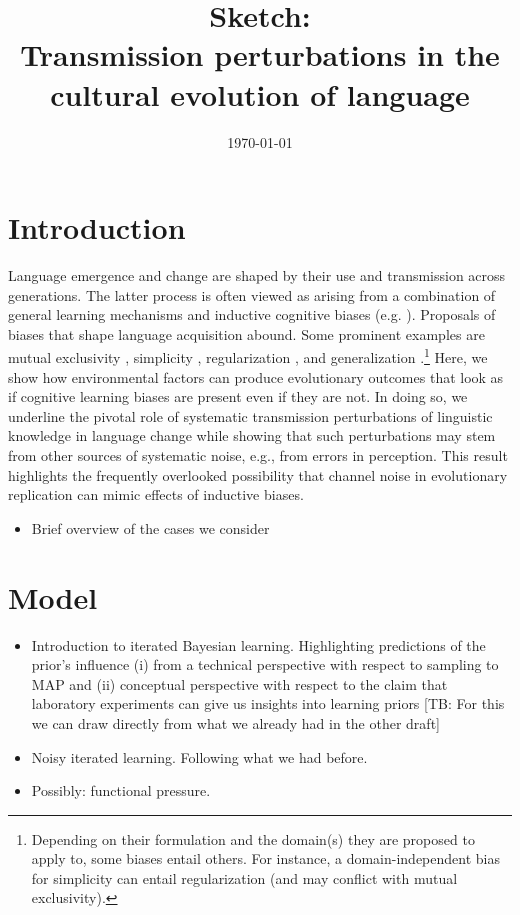 \documentclass[11pt]{article}
\title{Sketch:\\Transmission perturbations in the cultural evolution of language}
\author{%
    \today
}
\date{}
\newcommand{\tb}[1]{\textcolor[rgb]{.8,.33,.0}{[TB: #1]}}%
\begin{document}
\maketitle

\section{Introduction}
Language emergence and change are shaped by their use and transmission across generations. The latter process is often viewed as arising from a combination of general learning mechanisms and inductive cognitive biases (e.g. \citealt{griffiths+kalish:2007,kirby+etal:2014,tamariz+kirby:2016}).  Proposals of biases that shape language acquisition abound. Some prominent examples are mutual exclusivity \citep{merriman+bowman:1989,clark:2009}, simplicity \citep{kirby+etal:2015}, regularization \citep{hudson+etal:2005}, and generalization \citep{smith:2011,oconnor:2015}.\footnote{Depending on their formulation and the domain(s) they are proposed to apply to, some biases entail others. For instance, a domain-independent bias for simplicity can entail regularization (and may conflict with mutual exclusivity).} Here, we show how environmental factors can produce evolutionary outcomes that look as if cognitive learning biases are present even if they are not. In doing so, we underline the pivotal role of systematic transmission perturbations of linguistic knowledge in language change while showing that such perturbations may stem from other sources of systematic noise, e.g., from errors in perception. This result highlights the frequently overlooked possibility that channel noise in evolutionary replication can mimic effects of inductive biases.

\begin{itemize}
  \item Brief overview of the cases we consider
\end{itemize}


\section{Model}

\begin{itemize}
  \item Introduction to iterated Bayesian learning. Highlighting predictions of the prior's influence (i) from a technical perspective with respect to sampling to MAP and (ii) conceptual perspective with respect to the claim that laboratory experiments can give us insights into learning priors \tb{For this we can draw directly from what we already had in the other draft}
  \item Noisy iterated learning. Following what we had before.
  \item Possibly: functional pressure.
\end{itemize}
\end{document}
